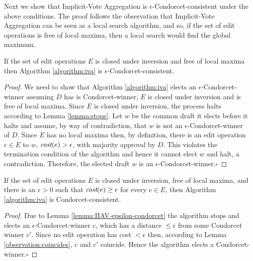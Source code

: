 \documentclass{llncs}
\newcommand{\qqed}{\hfill$\square$}
\newcommand{\cost}{\emph{cost}}
\begin{document}
Next we show that Implicit-Vote Aggregation is $\epsilon$-Condorcet-consistent under the above conditions. The proof follows the observation that Implicit-Vote Aggregation can be seen as a local search algorithm, and so, if the set of edit operations is free of local maxima, then a local search would find the global maximum.

\begin{lemma}\label{lemma:IIAV-epsilon-condorcet}
If the set of edit operations $E$ is closed under inversion and free of local maxima then Algorithm \ref{algorithm:iva} is $\epsilon$-Condorcet-consistent.
\end{lemma}

\begin{proof}
%
We need to show that Algorithm \ref{algorithm:iva} elects an $\epsilon$-Condorcet-winner assuming $D$ has is Condorcet-winner,  $E$ is closed under inversion and is free of local maxima.
Since $E$ is closed under inversion, the process halts according to Lemma \ref{lemma:stops}.  Let $w$ be the common draft it elects before it halts and assume, by way of contradiction, that $w$ is not an $\epsilon$-Condorcet-winner of $D$.  Since $E$ has no local maxima then, by definition, there is an edit operation $e \in E$ to $w$, $\cost(e) > \epsilon$, with majority approval by $D$.  This violates the termination condition of the algorithm and hence it cannot elect $w$ and halt, a contradiction.   Therefore, the elected draft $w$ is an $\epsilon$-Condorcet-winner.\qqed
%
\end{proof}

\begin{corollary}\label{corollary:IIAV--condorcet}
If the set of edit operations $E$ is closed under inversion, free of local maxima, and there is an $\epsilon > 0$ such that $\cost(e) \ge \epsilon$ for every $e \in E$, then Algorithm \ref{algorithm:iva} is Condorcet-consistent.
\end{corollary}

\begin{proof}
%
Due to Lemma \ref{lemma:IIAV-epsilon-condorcet} the algorithm stops and elects an $\epsilon$-Condorcet-winner $c$, which has a distance $\le \epsilon$ from some Condorcet winner $c'$.
Since no edit operation has cost $< \epsilon$ then, according to Lemma \ref{observation:coincides}, $c$ and $c'$ coincide.  Hence the algorithm elects a Condorcet-winner.\qqed
%
\end{proof}
\end{document}
